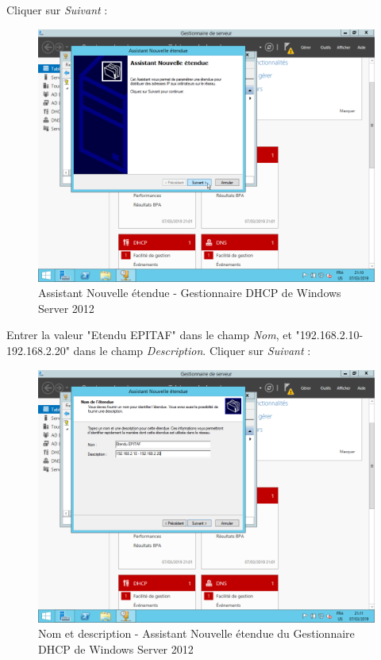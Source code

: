 \newpage
Cliquer sur \textit{Suivant} :
\begin{figure}[h!]
    \begin{center}
        \includegraphics[scale=0.6]{WS2012_Screenshots/42.png}
        \caption{Assistant Nouvelle étendue - Gestionnaire DHCP de Windows Server 2012}
        \label{WS2012_Screenshots/42}
    \end{center}
\end{figure}
\FloatBarrier

\newpage
Entrer la valeur "Etendu EPITAF" dans le champ \textit{Nom}, et "192.168.2.10-192.168.2.20" dans le champ \textit{Description}. Cliquer sur \textit{Suivant} :
\begin{figure}[h!]
    \begin{center}
        \includegraphics[scale=0.6]{WS2012_Screenshots/43.png}
        \caption{Nom et description - Assistant Nouvelle étendue du Gestionnaire DHCP de Windows Server 2012}
        \label{WS2012_Screenshots/43}
    \end{center}
\end{figure}
\FloatBarrier

